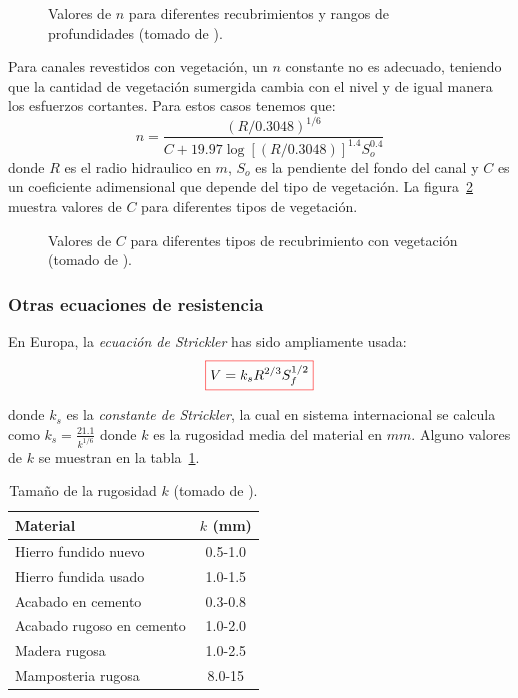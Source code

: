\documentclass[11pt, oneside]{article}
\begin{document}
\begin{figure}[h]
\centering
\caption{Valores de $n$ para diferentes recubrimientos y rangos de profundidades (tomado de \cite{Chau}).}
\label{fig5}
\end{figure}

Para canales revestidos con vegetaci\'on, un $n$ constante no es adecuado, teniendo que la cantidad de vegetaci\'on sumergida cambia con el nivel y de igual manera los esfuerzos cortantes. Para estos casos tenemos que:
$$
n=\frac{\left( R/0.3048 \right)^{1/6}}{C + 19.97 \log \left[ \left( R/0.3048 \right) \right]^{1.4} S_o^{0.4}}
$$
donde $R$ es el radio hidraulico en $m$, $S_o$ es la pendiente del fondo del canal y $C$ es un coeficiente adimensional que depende del tipo de vegetaci\'on. La figura~\ref{fig6} muestra valores de $C$ para diferentes tipos de vegetaci\'on. 

\begin{figure}[h]
\centering
\caption{Valores de $C$ para diferentes tipos de recubrimiento con vegetaci\'on (tomado de \cite{Chau}).}
\label{fig6}
\end{figure}

\subsubsection{Otras ecuaciones de resistencia}
En Europa, la \emph{ecuaci\'on de Strickler} has sido ampliamente usada:
\begin{equation}
\color{red}\boxed{\color{black} V = k_s R^{2/3} S_f^{1/2}}
\label{eq18}
\end{equation}

donde $k_s$ es la \emph{constante de Strickler}, la cual en sistema internacional se calcula como $k_s = \frac{21.1}{k^{1/6}}$ donde $k$ es la rugosidad media del material en $mm$. Alguno valores de $k$ se muestran en la tabla~\ref{ta2}.

\begin{table}[h!]
\centering
\begin{tabular}{l c}
 \hline
  Material & $k$ (mm) \\ [0.5ex]
 \hline\hline
 Hierro fundido nuevo & 0.5-1.0 \\
 Hierro fundida usado & 1.0-1.5 \\
 Acabado en cemento & 0.3-0.8 \\
 Acabado rugoso en cemento & 1.0-2.0 \\
 Madera rugosa & 1.0-2.5 \\
 Mamposteria rugosa & 8.0-15 \\
\hline
\end{tabular}
\caption{Tamaño de la rugosidad $k$ (tomado de \cite{VChow}).}
\label{ta2}
\end{table}
\end{document}
